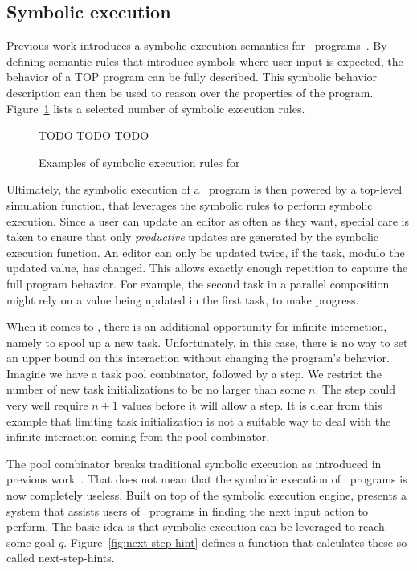 
\subsection{Symbolic execution}

Previous work introduces a symbolic execution semantics for \TOPHAT\ programs~\cite{conf/ifl/NausSK19}. 
By defining semantic rules that introduce symbols where user input is expected, the behavior of a TOP program can be fully described.
This symbolic behavior description can then be used to reason over the properties of the program. 
Figure~\ref{fig:symbolic-semantics} lists a selected number of symbolic execution rules.

\begin{figure}
    TODO TODO TODO
    \caption{Examples of symbolic execution rules for \TOPHAT}
    \label{fig:symbolic-semantics}
\end{figure}

Ultimately, the symbolic execution of a \TOPHAT\ program is then powered by a top-level simulation function, that leverages the symbolic rules to perform symbolic execution.
Since a user can update an editor as often as they want, special care is taken to ensure that only \textit{productive} updates are generated by the symbolic execution function.
An editor can only be updated twice, if the task, modulo the updated value, has changed.
This allows exactly enough repetition to capture the full program behavior.
For example, the second task in a parallel composition might rely on a value being updated in the first task, to make progress. 

When it comes to \DYNTOPHAT, there is an additional opportunity for infinite interaction, namely to spool up a new task.
Unfortunately, in this case, there is no way to set an upper bound on this interaction without changing the program's behavior.
Imagine we have a task pool combinator, followed by a step.
We restrict the number of new task initializations to be no larger than some $n$.
The step could very well require $n+1$ values before it will allow a step.
It is clear from this example that limiting task initialization is not a suitable way to deal with the infinite interaction coming from the pool combinator.

The pool combinator breaks traditional symbolic execution as introduced in previous work~\cite{conf/ifl/NausSK19}.
That does not mean that the symbolic execution of \DYNTOPHAT\ programs is now completely useless.
Built on top of the symbolic execution engine, \citet{conf/sfp/NausS20} presents a system that assists users of \TOPHAT\ programs in finding the next input action to perform.
The basic idea is that symbolic execution can be leveraged to reach some goal $g$.
Figure~\ref{fig:next-step-hint} defines a function that calculates these so-called next-step-hints.

